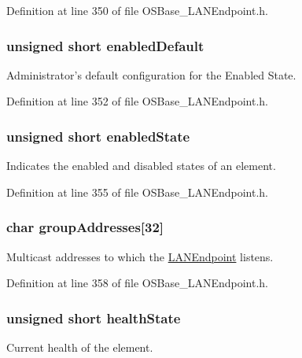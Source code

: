 Definition at line 350 of file OSBase\_\-LANEndpoint.h.\hypertarget{struct_l_a_n_endpoint_af4231713a84892d0f772d1bdfc8b541f}{
\subsubsection[{enabledDefault}]{\setlength{\rightskip}{0pt plus 5cm}unsigned short {\bf enabledDefault}}}
\label{struct_l_a_n_endpoint_af4231713a84892d0f772d1bdfc8b541f}
Administrator's default configuration for the Enabled State. 

Definition at line 352 of file OSBase\_\-LANEndpoint.h.\hypertarget{struct_l_a_n_endpoint_a719c20be3591f4cfad2db11f3410fe10}{
\subsubsection[{enabledState}]{\setlength{\rightskip}{0pt plus 5cm}unsigned short {\bf enabledState}}}
\label{struct_l_a_n_endpoint_a719c20be3591f4cfad2db11f3410fe10}
Indicates the enabled and disabled states of an element. 

Definition at line 355 of file OSBase\_\-LANEndpoint.h.\hypertarget{struct_l_a_n_endpoint_a6aaad4baebd4dfe5c0fc50f4dc89655d}{
\subsubsection[{groupAddresses}]{\setlength{\rightskip}{0pt plus 5cm}char {\bf groupAddresses}\mbox{[}32\mbox{]}}}
\label{struct_l_a_n_endpoint_a6aaad4baebd4dfe5c0fc50f4dc89655d}
Multicast addresses to which the \hyperlink{struct_l_a_n_endpoint}{LANEndpoint} listens. 

Definition at line 358 of file OSBase\_\-LANEndpoint.h.\hypertarget{struct_l_a_n_endpoint_abe815d40163da155690cb848f45d5c5a}{
\subsubsection[{healthState}]{\setlength{\rightskip}{0pt plus 5cm}unsigned short {\bf healthState}}}
\label{struct_l_a_n_endpoint_abe815d40163da155690cb848f45d5c5a}
Current health of the element. 

